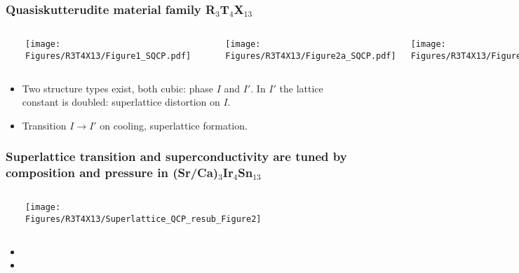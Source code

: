 \begin{frame}[label=CIS-1]
\frametitle{Quasiskutterudite material family R$_3$T$_4$X$_{13}$}

\begin{columns}[t]
\centerline{~}
\centerline{\texttt{[image: \\Figures/R3T4X13/Figure1\_SQCP.pdf]}}
\centerline{~}
\centerline{\texttt{[image: \\Figures/R3T4X13/Figure2a\_SQCP.pdf]}}
\centerline{\texttt{[image: \\Figures/R3T4X13/Figure2b\_SQCP.pdf]}}
\end{columns}

\begin{itemize}

\item
Two structure types exist, both cubic: phase $I$ and $I'$. In $I'$ the lattice constant is doubled: superlattice distortion on $I$. 

\item
Transition $I \rightarrow I'$ on cooling, superlattice formation.
\end{itemize}

\end{frame}


\begin{frame}[label=CIS-2]
\frametitle{Superlattice transition and superconductivity are tuned by
  composition and pressure in (Sr/Ca)$_3$Ir$_4$Sn$_{13}$}
\begin{columns}[t]
\vspace{-0.7em}
\centerline{~}
\centerline{\texttt{[image: \\Figures/R3T4X13/Superlattice\_QCP\_resub\_Figure2]}}
\centerline{~}
\end{columns}

\begin{itemize}
\item
{}
\item
{}
\end{itemize}


\end{frame}

